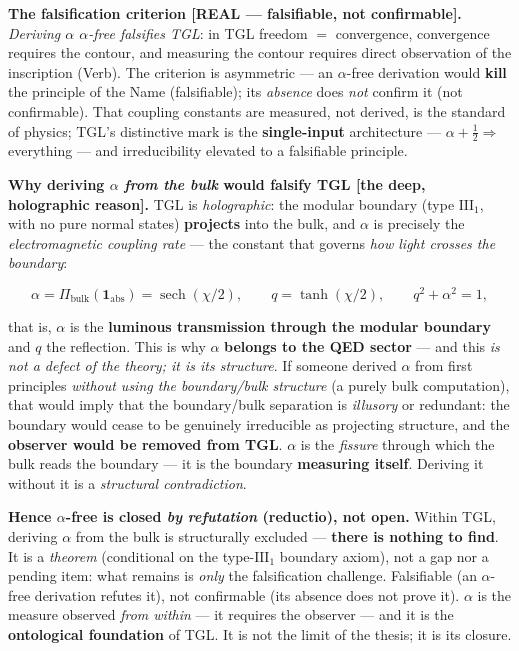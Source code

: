 \documentclass[11pt]{article}
\theoremstyle{definition}\newtheorem{deriv}{Derivation}
\begin{document}
\textbf{The falsification criterion \textsf{[REAL --- falsifiable, not confirmable]}.} \emph{Deriving $\alpha$ $\alpha$-free falsifies TGL}: in TGL freedom $=$ convergence, convergence requires the contour, and measuring the contour requires direct observation of the inscription (Verb). The criterion is asymmetric --- an $\alpha$-free derivation would \textbf{kill} the principle of the Name (falsifiable); its \emph{absence} does \emph{not} confirm it (not confirmable). That coupling constants are measured, not derived, is the standard of physics; TGL's distinctive mark is the \textbf{single-input} architecture --- $\alpha+\tfrac12\Rightarrow$ everything --- and irreducibility elevated to a falsifiable principle.

\textbf{Why deriving $\alpha$ \emph{from the bulk} would falsify TGL \textsf{[the deep, holographic reason]}.} TGL is \emph{holographic}: the modular boundary (type $\mathrm{III}_1$, with no pure normal states) \textbf{projects} into the bulk, and $\alpha$ is precisely the \emph{electromagnetic coupling rate} --- the constant that governs \emph{how light crosses the boundary}:

\begin{equation}\alpha=\Pi_{\mathrm{bulk}}(\mathbf{1}_{\mathrm{abs}})=\operatorname{sech}(\chi/2),\qquad q=\tanh(\chi/2),\qquad q^2+\alpha^2=1,\end{equation}

that is, $\alpha$ is the \textbf{luminous transmission through the modular boundary} and $q$ the reflection. This is why $\alpha$ \textbf{belongs to the QED sector} --- and this \emph{is not a defect of the theory; it is its structure}. If someone derived $\alpha$ from first principles \emph{without using the boundary/bulk structure} (a purely bulk computation), that would imply that the boundary/bulk separation is \emph{illusory} or redundant: the boundary would cease to be genuinely irreducible as projecting structure, and the \textbf{observer would be removed from TGL}. $\alpha$ is the \emph{fissure} through which the bulk reads the boundary --- it is the boundary \textbf{measuring itself}. Deriving it without it is a \emph{structural contradiction}.

\textbf{Hence $\alpha$-free is closed \emph{by refutation} (reductio), not open.} Within TGL, deriving $\alpha$ from the bulk is structurally excluded --- \textbf{there is nothing to find}. It is a \emph{theorem} (conditional on the type-$\mathrm{III}_1$ boundary axiom), not a gap nor a pending item: what remains is \emph{only} the falsification challenge. Falsifiable (an $\alpha$-free derivation refutes it), not confirmable (its absence does not prove it). $\alpha$ is the measure observed \emph{from within} --- it requires the observer --- and it is the \textbf{ontological foundation} of TGL. It is not the limit of the thesis; it is its closure.
\end{document}
